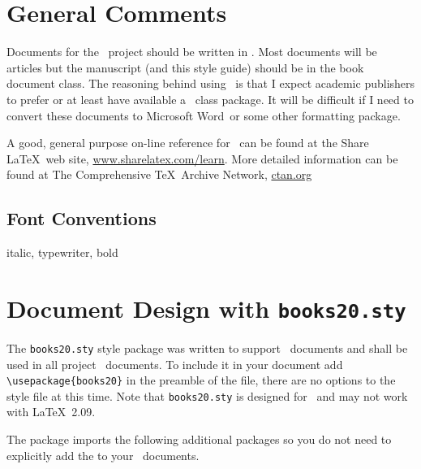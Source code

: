 
\section{General Comments}

Documents for the \ProjectTitle\ project should be written in
\LaTeXe. Most documents will be articles but the manuscript (and this
style guide) should be in the book document class. The reasoning
behind using \LaTeXe\ is that I expect academic publishers to prefer
or at least have available a \LaTeXe\ class package.  It will be
difficult if I need to convert these documents to Microsoft
Word\texttrademark\ or some other formatting package.

A good, general purpose on-line reference for \LaTeXe\ can be found at
the Share \LaTeX\ web site,
\href{http://www.sharelatex.com/learn}{www.sharelatex.com/learn}.
More detailed information can be found at The Comprehensive
\TeX\ Archive Network, \href{ctan.org}{ctan.org}

\subsection{Font Conventions}

italic, typewriter, bold

\section{Document Design with \texttt{books20.sty}}

The \texttt{books20.sty} style package was written to support
\ProjectTitle\ documents and shall be used in all project
\LaTeXe\ documents. To include it in your document add
\verb|\usepackage{books20}| in the preamble of the file, there are no
options to the style file at this time. Note that \texttt{books20.sty}
is designed for \LaTeXe\ and may not work with \LaTeX\ 2.09.

The package imports the following additional packages so you
do not need to explicitly add the to your \LaTeXe\ documents.

